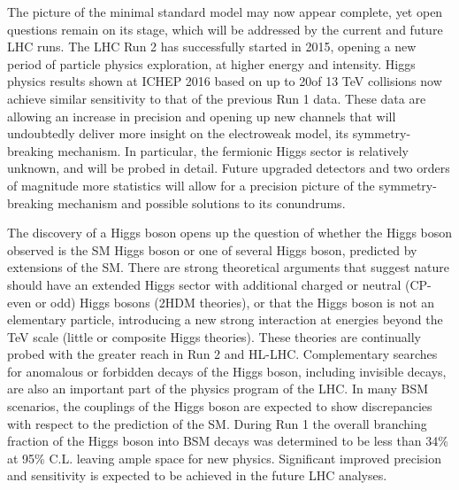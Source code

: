 The picture of the minimal standard model may now appear complete,
yet open questions remain on its stage, which will be addressed by the
current and future LHC runs. The LHC Run 2 has successfully started in
2015, opening a new period of particle physics exploration, at higher
energy and intensity. Higgs physics results shown at ICHEP 2016 based on
up to 20\fb of 13 TeV collisions now achieve similar sensitivity to
that of the previous Run 1 data. These data are allowing an increase in
precision and opening up new channels that will undoubtedly deliver more
insight on the electroweak model, its symmetry-breaking mechanism. In
particular, the fermionic Higgs sector is relatively unknown, and will
be probed in detail. Future upgraded detectors and two orders of
magnitude more statistics will allow for a precision picture of the
symmetry-breaking mechanism and possible solutions to its conundrums.
\medskip

\noindent The discovery of a Higgs boson opens up the question of whether the
Higgs boson observed is the SM Higgs boson or one of several Higgs
boson, predicted by extensions of the SM. There are strong theoretical
arguments that suggest nature should have an extended Higgs sector with
additional charged or neutral (CP-even or odd) Higgs bosons (2HDM
theories), or that the Higgs boson is not an elementary particle,
introducing a new strong interaction at energies beyond the TeV scale
(little or composite Higgs theories). These theories are continually
probed with the greater reach in Run 2 and HL-LHC. Complementary
searches for anomalous or forbidden decays of the Higgs boson, including
invisible decays, are also an important part of the physics program of
the LHC. In many BSM scenarios, the couplings of the Higgs boson are
expected to show discrepancies with respect to the prediction of the SM.
During Run 1 the overall branching fraction of the Higgs boson into BSM
decays was determined to be less than 34\% at 95\% C.L. leaving ample
space for new physics. Significant improved precision and sensitivity is
expected to be achieved in the future LHC analyses.